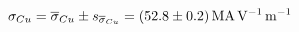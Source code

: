 
\begin{equation}
    \sigma_{Cu}
        = \overline{\sigma}_{Cu} \pm s_{\overline{\sigma}_{Cu}}
        = \SI[separate-uncertainty = true]{52.8 \pm 0.2 }{\mega\ampere\per\volt\per\meter}
\end{equation}

